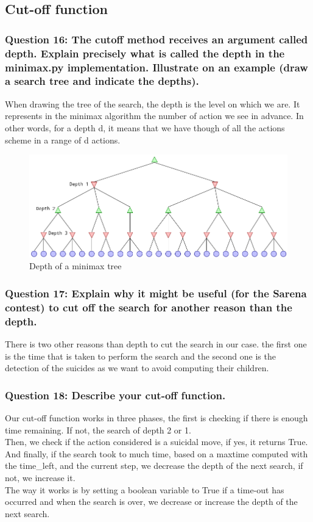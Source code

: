 \documentclass[a4paper,10pt]{article}
\begin{document}
			\subsection{Cut-off function}
				\subsubsection{Question 16: The cutoff method receives an argument called depth. Explain precisely what is called the depth in the minimax.py implementation. Illustrate on an example (draw a search tree and indicate the depths).}
					When drawing the tree of the search, the depth is the level on which we are. It represents in the minimax algorithm the number of action we see in advance. In other words, for a depth d, it means that we have though of all the actions scheme in a range of d actions.\\
					\begin{figure}[h!]
						\centering
							\includegraphics[scale=0.4]{arbre_depth.png}
						\caption{Depth of a minimax tree}
						\label{fig:server_connection}	
					\end{figure}
				\subsubsection{Question 17: Explain why it might be useful (for the Sarena contest) to cut off the search for another reason than the depth.}
					There is two other reasons than depth to cut the search in our case. the first one is the time that is taken to perform the search and the second one is the detection of the suicides as we want to avoid computing their children.
				\subsubsection{Question 18: Describe your cut-off function.}
					Our cut-off function works in three phases, the first is checking if there is enough time remaining. If not, the search of depth 2 or 1.\\
					Then, we check if the action considered is a suicidal move, if yes, it returns True.\\
					And finally, if the search took to much time, based on a maxtime computed with the time\_left, and the current step, we decrease the depth of the next search, if not, we increase it.\\
					The way it works is by setting a boolean variable to True if a time-out has occurred and when the search is over, we decrease or increase the depth of the next search.
\end{document}
